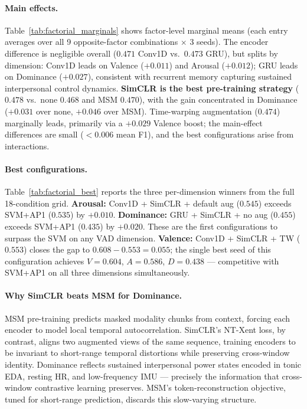 \documentclass[sigconf,review,anonymous]{acmart}
\begin{document}
\paragraph{Main effects.}
Table~\ref{tab:factorial_marginals} shows factor-level marginal means
(each entry averages over all 9 opposite-factor combinations $\times$ 3 seeds).
The encoder difference is negligible overall ($0.471$ Conv1D vs.\ $0.473$
GRU), but splits by dimension: Conv1D leads on Valence ($+0.011$) and Arousal
($+0.012$); GRU leads on Dominance ($+0.027$), consistent with recurrent
memory capturing sustained interpersonal control dynamics.
\textbf{SimCLR is the best pre-training strategy} ($0.478$ vs.\ none $0.468$
and MSM $0.470$), with the gain concentrated in Dominance
($+0.031$ over none, $+0.046$ over MSM).
Time-warping augmentation ($0.474$) marginally leads, primarily via a
$+0.029$ Valence boost; the main-effect differences are small
($<0.006$ mean F1), and the best configurations arise from interactions.

\paragraph{Best configurations.}
Table~\ref{tab:factorial_best} reports the three per-dimension winners from
the full 18-condition grid.
\textbf{Arousal:} Conv1D + SimCLR + default aug ($0.545$) exceeds SVM+AP1
($0.535$) by $+0.010$.
\textbf{Dominance:} GRU + SimCLR + no aug ($0.455$) exceeds SVM+AP1
($0.435$) by $+0.020$.
These are the first configurations to surpass the SVM on any VAD dimension.
\textbf{Valence:} Conv1D + SimCLR + TW ($0.553$) closes the gap to
$0.608 - 0.553 = 0.055$; the single best seed of this configuration
achieves $V{=}0.604$, $A{=}0.586$, $D{=}0.438$ --- competitive with
SVM+AP1 on all three dimensions simultaneously.

\paragraph{Why SimCLR beats MSM for Dominance.}
MSM pre-training predicts masked modality chunks from context, forcing each
encoder to model local temporal autocorrelation.
SimCLR's NT-Xent loss, by contrast, aligns two augmented views of the same
sequence, training encoders to be invariant to short-range temporal
distortions while preserving cross-window identity.
Dominance reflects sustained interpersonal power states encoded in tonic EDA,
resting HR, and low-frequency IMU --- precisely the information that
cross-window contrastive learning preserves.
MSM's token-reconstruction objective, tuned for short-range prediction,
discards this slow-varying structure.
\end{document}

